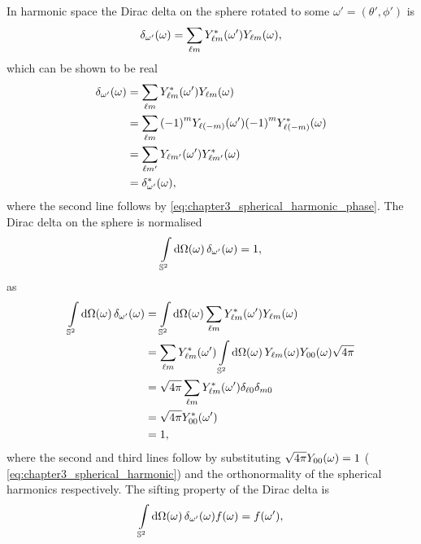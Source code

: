 In harmonic space the Dirac delta on the sphere rotated to some \(\omega'=(\theta',\phi')\) is
%
\begin{equation}
	\pixel{\delta_{\omega'}}
	= \harmonicSum \pixel[']{\conj{\harmonic{Y}}} \pixel{\harmonic{Y}},
\end{equation}
%
which can be shown to be real
%
\begin{align}\label{eq:chapter3_dirac_delta_real}
	\pixel{\delta_{\omega'}}
	 & = \harmonicSum \pixel[']{\conj{\harmonic{Y}}} \pixel{\harmonic{Y}} \nonumber{}                           \\
	 & = \harmonicSum \phaseFactor \pixel[']{Y_{\ell(-m)}} \phaseFactor \pixel{\conj{Y_{\ell(-m)}}} \nonumber{} \\
	 & = \sum\limits_{\ell m'} \pixel[']{Y_{\ell m'}} \pixel{\conj{Y_{\ell m'}}} \nonumber{}                    \\
	 & = \pixel{\conj{\delta_{\omega'}}},
\end{align}
%
where the second line follows by \cref{eq:chapter3_spherical_harmonic_phase}.
The Dirac delta on the sphere is normalised
%
\begin{equation}
	\integrateSphere{\omega} \pixel{\delta_{\omega'}}
	= 1,
\end{equation}
%
as
%
\begin{align}
	\integrateSphere{\omega} \pixel{\delta_{\omega'}}
	 & = \integrateSphere{\omega} \harmonicSum \pixel[']{\conj{\harmonic{Y}}} \pixel{\harmonic{Y}} \nonumber{}                            \\
	 & = \harmonicSum \pixel[']{\conj{\harmonic{Y}}} \integrateSphere{\omega} \pixel{\harmonic{Y}} \pixel{Y_{00}} \sqrt{4\pi} \nonumber{} \\
	 & = \sqrt{4\pi} \harmonicSum \pixel[']{\conj{\harmonic{Y}}} \delta_{\ell0} \delta_{m0} \nonumber{}                                   \\
	 & = \sqrt{4\pi} \pixel[']{\conj{Y_{00}}} \nonumber{}                                                                                 \\
	 & = 1,
\end{align}
%
where the second and third lines follow by substituting \(\sqrt{4\pi}\pixel{Y_{00}}=1\) (\cf{} \cref{eq:chapter3_spherical_harmonic}) and the orthonormality of the spherical harmonics respectively.
The sifting property of the Dirac delta is
%
\begin{equation}
	\integrateSphere{\omega} \pixel{\delta_{\omega'}} \pixel{f}
	= \pixel[']{f},
\end{equation}
